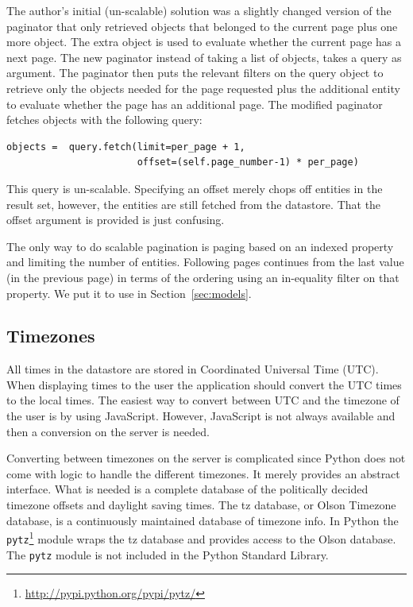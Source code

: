 The author's initial (un-scalable) solution was a slightly changed version of the
paginator that only retrieved objects that belonged to the current page plus one
more object. The extra object is used to evaluate whether the current page has a
next page. The new paginator instead of taking a list of objects, takes a query
as argument. The paginator then puts the relevant filters on the query object to
retrieve only the objects needed for the page requested plus the additional
entity to evaluate whether the page has an additional page. The modified
paginator fetches objects with the following query:
\begin{verbatim}
objects =  query.fetch(limit=per_page + 1,
                       offset=(self.page_number-1) * per_page)
\end{verbatim}
This query is un-scalable. Specifying an offset merely chops off entities in the
result set, however, the entities are still fetched from the datastore. That the
offset argument is provided is just confusing.

The only way to do scalable pagination is paging based on an indexed property and
limiting the number of entities. Following pages continues from the last value
(in the previous page) in terms of the ordering using an in-equality filter on
that property. We put it to use in Section~\ref{sec:models}.


\subsection{Timezones}\label{sec:gae_tz}
All times in the datastore are stored in Coordinated Universal Time (UTC). When
displaying times to the user the application should convert the UTC times to the
local times. The easiest way to convert between UTC and the timezone of the user
is by using JavaScript. However, JavaScript is not always available and then a
conversion on the server is needed.

Converting between timezones on the server is complicated since Python does not
come with logic to handle the different timezones. It merely provides an abstract
interface. What is needed is a complete database of the politically decided
timezone offsets and daylight saving times. The tz database, or Olson Timezone
database, is a continuously maintained database of timezone info. In Python the
\verb|pytz|\footnote{\url{http://pypi.python.org/pypi/pytz/}} module wraps the tz
database and provides access to the Olson database. The \verb|pytz| module is not
included in the Python Standard Library.

